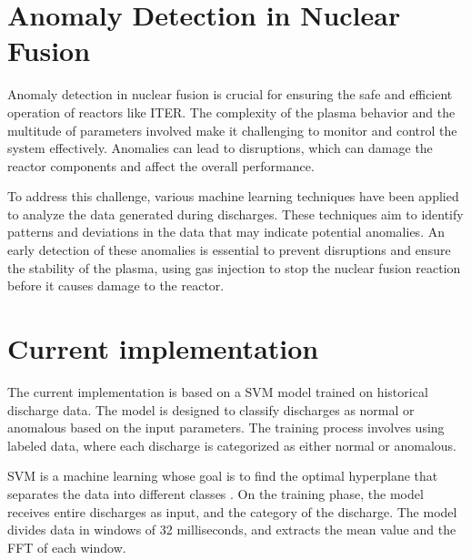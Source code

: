 \section{Anomaly Detection in Nuclear Fusion}

Anomaly detection in nuclear fusion is crucial for ensuring the safe and efficient operation of reactors like \ac{ITER}. The complexity of the plasma behavior and the multitude of parameters involved make it challenging to monitor and control the system effectively. Anomalies can lead to disruptions, which can damage the reactor components and affect the overall performance.

To address this challenge, various machine learning techniques have been applied to analyze the data generated during discharges. These techniques aim to identify patterns and deviations in the data that may indicate potential anomalies. An early detection of these anomalies is essential to prevent disruptions and ensure the stability of the plasma, using gas injection to stop the nuclear fusion reaction before it causes damage to the reactor.

\section{Current implementation}

The current implementation is based on a \ac{SVM} model trained on historical discharge data. The model is designed to classify discharges as normal or anomalous based on the input parameters. The training process involves using labeled data, where each discharge is categorized as either normal or anomalous.

\ac{SVM} is a machine learning whose goal is to find the optimal hyperplane that separates the data into different classes \autocite{6524743}. On the training phase, the model receives entire discharges as input, and the category of the discharge. The model divides data in windows of 32 milliseconds, and extracts the mean value and the \ac{FFT} of each window.

